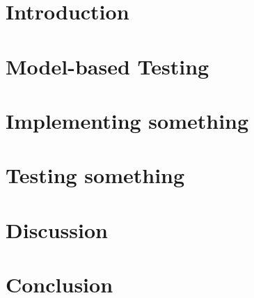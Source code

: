 \documentclass[a4paper, 12pt,titlepage]{dithesis}
\begin{document}
\setlongtables
\begin{longtable}[l]{p{3cm}p{}}



\end{longtable}
\setcounter{table}{0}

\chapter{Introduction}
\sivunumerot
\thispagestyle{empty}

\chapter{Model-based Testing}


\chapter{Implementing something}

\chapter{Testing something}

\chapter{Discussion}

\chapter{Conclusion}



\end{document}
